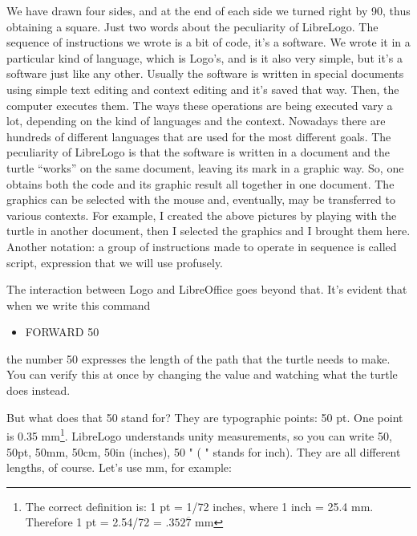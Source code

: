 We have drawn four sides, and at the end of each side we turned right by 90\degree, thus obtaining a square.
Just two words about the peculiarity of LibreLogo. The sequence of instructions we wrote is a bit of code, it’s a software. We wrote it in a particular kind of language, which is Logo's, and is it also very simple, but it's a software just like any other.
Usually the software is written in special documents using simple text editing and context editing and it’s saved that way.
Then, the computer executes them.
The ways these operations are being executed vary a lot, depending on the kind of languages and the context.
Nowadays there are hundreds of different languages that are used for the most different goals.
The peculiarity of LibreLogo is that the software is written in a document and the turtle “works” on the same document, leaving its mark in a graphic way.
So, one obtains both the code and its graphic result all together in one document.
The graphics can be selected with the mouse and, eventually, may be transferred to various contexts.
For example, I created the above pictures by playing with the turtle in another document, then I selected the graphics and I brought them here. Another notation: a group of instructions made to operate in sequence is called script, expression that we will use profusely.

The interaction between Logo and LibreOffice goes beyond that. It’s evident that when we write this command

\vskip 1cm

\begin{scriptsize}
\begin{minipage}{1.0\textwidth}
\begin{itemize}[itemsep=-3pt,parsep=2pt]
\item[] \hspace{0.5cm} FORWARD 50  
\end{itemize}
\end{minipage}
\end{scriptsize}

\vskip 1cm

the number 50 expresses the length of the path that the turtle needs to make. You can verify this at once by changing the value and watching what the turtle does instead.

But what does that 50 stand for?
They are typographic points: 50 pt. One point is 0.35 mm\footnote {The correct definition is: 1 pt = 1/72 inches, where 1 inch = 25.4 mm. Therefore 1 pt = 2.54/72 = $.352\overline{7}$ mm}. LibreLogo understands unity measurements, so you can write 50, 50pt, 50mm, 50cm, 50in (inches), 50 " ( " stands for inch). They are all different lengths, of course. Let's use mm, for example:

